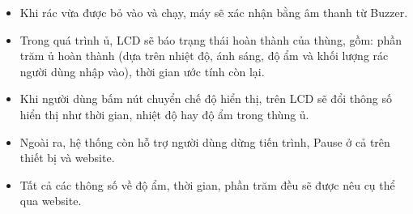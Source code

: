 \documentclass[12pt, a4paper]{article}
\begin{document}
\begin{itemize}
    \item Khi rác vừa được bỏ vào và chạy, máy sẽ xác nhận bằng âm thanh từ Buzzer.
    \item Trong quá trình ủ, LCD sẽ báo trạng thái hoàn thành của thùng, gồm: phần trăm ủ hoàn thành (dựa trên nhiệt độ, ánh sáng, độ ẩm và khối lượng rác người dùng nhập vào), thời gian ước tính còn lại.
    \item Khi người dùng bấm nút chuyển chế độ hiển thị, trên LCD sẽ đổi thông số hiển thị như thời gian, nhiệt độ hay độ ẩm trong thùng ủ.
    \item Ngoài ra, hệ thống còn hỗ trợ người dùng dừng tiến trình, Pause ở cả trên thiết bị và website.
    \item Tất cả các thông số về độ ẩm, thời gian, phần trăm đều sẽ được nêu cụ thể qua website. 
\end{itemize}
\end{document}
